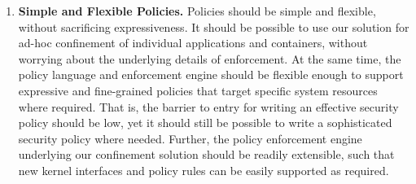 \begin{enumerate}[font=\bfseries]
  \item \textbf{Simple and Flexible Policies.}
    Policies should be simple and flexible, without sacrificing expressiveness. It should
    be possible to use our solution for ad-hoc confinement of individual
    applications and containers, without worrying about the underlying details of
    enforcement. At the same time, the policy language and enforcement engine should be
    flexible enough to support expressive and fine-grained policies that target specific
    system resources where required. That is, the barrier to entry for writing an
    effective security policy should be low, yet it should still be possible to write
    a sophisticated security policy where needed. Further, the policy enforcement engine
    underlying our confinement solution should be readily extensible, such that new
    kernel interfaces and policy rules can be easily supported as required.




\end{enumerate}
